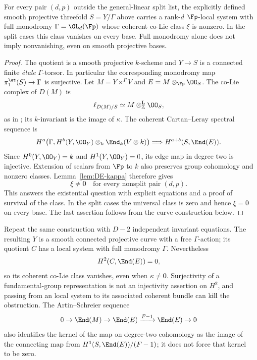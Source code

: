 \begin{theorem}\label{thm:DE-coherent-obstruction}
For every pair $(d,p)$ outside the general-linear split list, the explicitly defined smooth projective threefold $S=Y/\Gamma$ above carries a rank-$d$ \etale $\Fp$-local system with full monodromy $\Gamma=\GL_d(\Fp)$ whose coherent co-Lie class $\xi$ is nonzero.  In the split cases this class vanishes on every base.  Full monodromy alone does not imply nonvanishing, even on smooth projective bases.
\end{theorem}
\begin{proof}
The quotient is a smooth projective $k$-scheme and $Y\to S$ is a connected finite \emph{\'etale} $\Gamma$-torsor.  In particular the corresponding monodromy map $\pi_1^{\et}(S)\to\Gamma$ is surjective.  Let $M=Y\times^\Gamma V$ and $E=M\otimes_{\Fp}\OO_S$.  The co-Lie complex of $D(M)$ is
\[
 \ell_{D(M)/S}\simeq M\otimes^{\mathbf L}_{\mathbb Z}\OO_S,
\]
as in \cite[Proposition~B.4]{BerghRydh2019}; its $k$-invariant is the image of $\kappa$.  The coherent Cartan--Leray spectral sequence is
\[
 H^a\bigl(\Gamma,H^b(Y,\OO_Y)\otimes_k\End_k(V\otimes k)\bigr)
       \Longrightarrow H^{a+b}(S,\End(E)).
\]
Since $H^0(Y,\OO_Y)=k$ and $H^1(Y,\OO_Y)=0$, its edge map in degree two is injective.  Extension of scalars from $\Fp$ to $k$ also preserves group cohomology and nonzero classes.  Lemma~\ref{lem:DE-kappa} therefore gives
\[
 \xi\ne0\quad\text{for every nonsplit pair }(d,p).
\]
This answers the existential question with explicit equations and a proof of survival of the class.  In the split cases the universal class is zero and hence $\xi=0$ on every base.  The last assertion follows from the curve construction below.
\end{proof}

\begin{remark}\label{rem:DE-universal-negative}
Repeat the same construction with $D-2$ independent invariant equations.  The resulting $Y$ is a smooth connected projective curve with a free $\Gamma$-action; its quotient $C$ has a local system with full monodromy $\Gamma$.  Nevertheless
\[
 H^2(C,\End(E))=0,
\]
so its coherent co-Lie class vanishes, even when $\kappa\ne0$.  Surjectivity of a fundamental-group representation is not an injectivity assertion on $H^2$, and passing from an \etale local system to its associated coherent bundle can kill the obstruction.  The Artin--Schreier sequence
\[
 0\to\End(M)\to\End(E)\xrightarrow{F-1}\End(E)\to0
\]
also identifies the kernel of the map on degree-two cohomology as the image of the connecting map from $H^1(S,\End(E))/(F-1)$; it does not force that kernel to be zero.
\end{remark}

